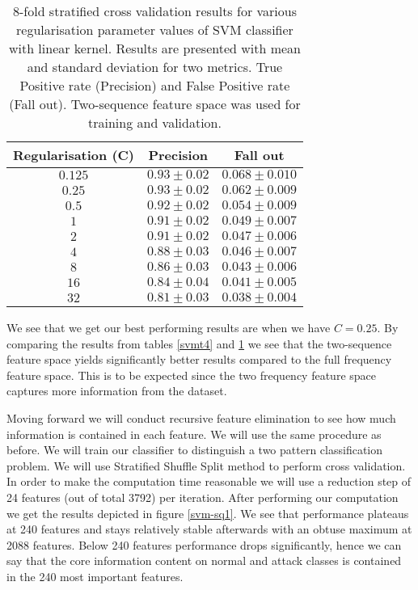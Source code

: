 \documentclass[reqno,openany,12pt]{amsbook}
\begin{document}
\begin{table}
\begin{tabular}{|c|c|c|}
\hline
Regularisation (C) &  Precision & Fall out \\ \hline 
$0.125$ &  $0.93 \pm 0.02$ & $0.068 \pm 0.010$ \\ \hline 
$0.25$ &  $0.93 \pm 0.02$ & $0.062 \pm 0.009$ \\ \hline 
$0.5$ &  $0.92 \pm 0.02$ & $0.054 \pm 0.009$ \\ \hline 
$1$ &  $0.91 \pm 0.02$ & $0.049 \pm 0.007$ \\ \hline 
$2$ &  $0.91 \pm 0.02$ & $0.047 \pm 0.006$ \\ \hline 
$4$ &  $0.88 \pm 0.03$ & $0.046 \pm 0.007$ \\ \hline 
$8$ &  $0.86 \pm 0.03$ & $0.043 \pm 0.006$ \\ \hline 
$16$ &  $0.84 \pm 0.04$ & $0.041\pm 0.005$ \\ \hline 
$32$ &  $0.81 \pm 0.03$ & $0.038 \pm 0.004$ \\ \hline
\end{tabular}
\vspace{5pt}
\caption[Cross Validation and Linear SVM regularisation on complete two-sequence feature space.]{8-fold stratified cross validation results for various regularisation parameter values of SVM classifier with linear kernel. Results are presented with mean and standard deviation for two metrics. True Positive rate (Precision) and False Positive rate (Fall out). Two-sequence feature space was used for training and validation.}
\label{svmt5}
\end{table}

We see that we get our best performing results are when we have $C=0.25$. By comparing the results from tables \ref{svmt4} and \ref{svmt5} we see that the two-sequence feature space yields significantly better results compared to the full frequency feature space. This is to be expected since the two frequency feature space captures more information from the dataset.

Moving forward we will conduct recursive feature elimination to see how much information is contained in each feature. We will use the same procedure as before. We will train our classifier to distinguish a two pattern classification problem. We will use Stratified Shuffle Split method to perform cross validation. In order to make the computation time reasonable we will use a reduction step of 24 features (out of total 3792) per iteration. After performing our computation we get the results depicted in figure \ref{svm-sq1}. We see that performance plateaus at 240 features and stays relatively stable afterwards with an obtuse maximum at 2088 features. Below 240 features performance drops significantly, hence we can say that the core information content on normal and attack classes is contained in the 240 most important features.
\end{document}
